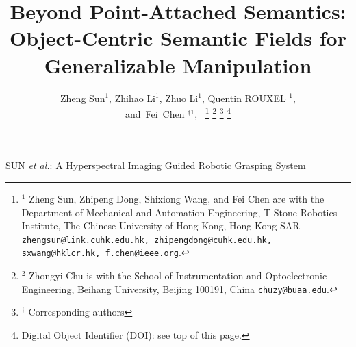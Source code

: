 \documentclass[letterpaper, 10 pt, journal, twoside]{IEEEtran}
\begin{document}
\title{Beyond Point-Attached Semantics: Object-Centric Semantic Fields for Generalizable Manipulation}
\author{Zheng Sun$^{1}$, Zhihao Li$^{1}$, Zhuo Li$^{1}$, Quentin ROUXEL $^{1}$,\\and~Fei~Chen $^{\dag 1}$,~
\thanks{
$^{1}$ Zheng Sun, Zhipeng Dong, Shixiong Wang, and Fei Chen are with the Department of Mechanical and Automation Engineering, T-Stone Robotics Institute, The Chinese University of Hong Kong, Hong Kong SAR {\tt \footnotesize zhengsun@link.cuhk.edu.hk, zhipengdong@cuhk.edu.hk,
sxwang@hklcr.hk, 
f.chen@ieee.org}.
}
\thanks{$^{2}$ Zhongyi Chu is with the School of Instrumentation and Optoelectronic Engineering, Beihang University, Beijing 100191, China  {\tt \footnotesize chuzy@buaa.edu}.}
\thanks{
$^{\dag}$ Corresponding authors
}
\thanks{Digital Object Identifier (DOI): see top of this page.}
}


{SUN \MakeLowercase{\textit{et al.}}: A Hyperspectral Imaging Guided Robotic Grasping System} 
\end{document}
